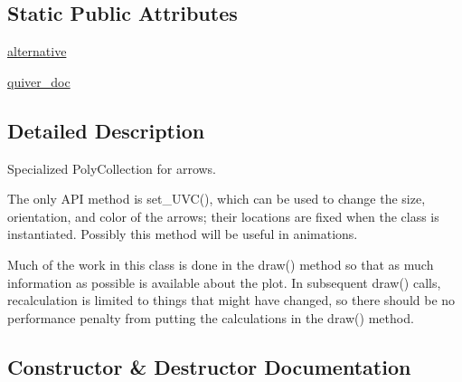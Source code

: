 \subsection*{Static Public Attributes}
\begin{DoxyCompactItemize}
\item 
\hyperlink{classmatplotlib_1_1quiver_1_1Quiver_a5418cbeebbdea96ba851165f9efe1e7b}{alternative}
\item 
\hyperlink{classmatplotlib_1_1quiver_1_1Quiver_a697a964b2986475b8458731a69f52a3a}{quiver\+\_\+doc}
\end{DoxyCompactItemize}


\subsection{Detailed Description}
\begin{DoxyVerb}Specialized PolyCollection for arrows.

The only API method is set_UVC(), which can be used
to change the size, orientation, and color of the
arrows; their locations are fixed when the class is
instantiated.  Possibly this method will be useful
in animations.

Much of the work in this class is done in the draw()
method so that as much information as possible is available
about the plot.  In subsequent draw() calls, recalculation
is limited to things that might have changed, so there
should be no performance penalty from putting the calculations
in the draw() method.
\end{DoxyVerb}
 

\subsection{Constructor \& Destructor Documentation}
\mbox{\label{classmatplotlib_1_1quiver_1_1Quiver_ab33a1afc67b51facb4060e0038017456}} 
